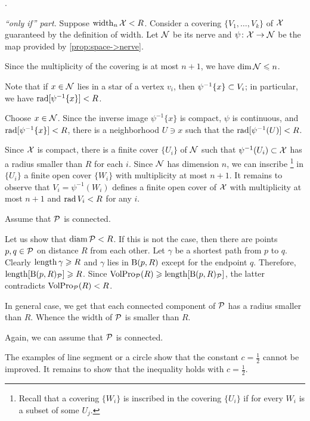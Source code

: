  \cite[Appendix $1(\text{E}_{2})$]{gromov-1983}.

\parbf{\ref{ex:width=suprad(inv)},} \textit{``only if'' part.}
Suppose $\operatorname{\rm width}\nolimits_n\mathcal{X}<R$.
Consider a covering $\{V_1,\dots,V_k\}$ of $\mathcal{X}$ guaranteed by the definition of width.
Let $\mathcal{N}$ be its nerve and $\psi\colon\mathcal{X}\to \mathcal{N}$ be the map provided by \ref{prop:space->nerve}.

Since the multiplicity of the covering is at most $n+1$, we have $\operatorname{\rm dim}\nolimits \mathcal{N}\leqslant n$.

Note that if $x\in \mathcal{N}$ lies in a star of a vertex $v_i$,
then $\psi^{-1}\{x\}\z\subset V_i$;
in particular, we have $\mathop{\rm rad}\nolimits[\psi^{-1}\{x\}]<R$.

Choose $x\in \mathcal{N}$.
Since the inverse image $\psi^{-1}\{x\}$ is compact, $\psi$ is continuous, and $\mathop{\rm rad}\nolimits[\psi^{-1}\{x\}]<R$,
there is a neighborhood $U\ni x$ such that the  $\mathop{\rm rad}\nolimits[\psi^{-1}(U)]<R$.

Since $\mathcal{X}$ is compact,  there is a finite cover $\{U_i\}$ of $\mathcal{N}$ such that $\psi^{-1}(U_i)\subset\mathcal{X}$ has a radius smaller than $R$ for each $i$.
Since $\mathcal{N}$ has dimension $n$, we can inscribe%
\footnote{Recall that a covering $\{W_i\}$ is inscribed in the covering $\{U_i\}$ if for every $W_i$ is a subset of some $U_j$.} 
in $\{U_i\}$ a finite open cover $\{W_i\}$ with multiplicity at most $n+1$.
It remains to observe that $V_i=\psi^{-1}(W_i)$ defines a finite open cover of $\mathcal{X}$ with  multiplicity at most $n+1$ and $\mathop{\rm rad}\nolimits V_i<R$ for any $i$. 

Assume that $\mathcal{P}$ is connected.

Let us show that $\operatorname{\rm diam}\nolimits\mathcal{P}<R$.
If this is not the case, then there are points $p,q\in\mathcal{P}$ on distance $R$ from each other.
Let $\gamma$ be a shortest path from $p$ to $q$.
Clearly $\mathop{\rm length}\nolimits\gamma\geqslant R$ and $\gamma$ lies in $\mathrm{B}{}(p,R)$ except for the endpoint $q$.
Therefore, $\mathop{\rm length}\nolimits[\mathrm{B}{}(p,R)_{\mathcal{P}}]\geqslant R$.
Since $\VolPro_{\spc{P}}(R)\z\ge \length[\oBall(p,R)_{\spc{P}}]$,
the latter contradicts $\operatorname{\rm VolPro}\nolimits_{\mathcal{P}}(R)<R$.

In general case, we get that each connected component of $\mathcal{P}$ has a radius smaller than $R$.
Whence the width of $\mathcal{P}$ is smaller than $R$.

 Again, we can assume that $\mathcal{P}$ is connected.

The examples of line segment or a circle show that the constant $c=\tfrac12$ cannot be improved.
It remains to show that the inequality holds with $c=\tfrac12$.

